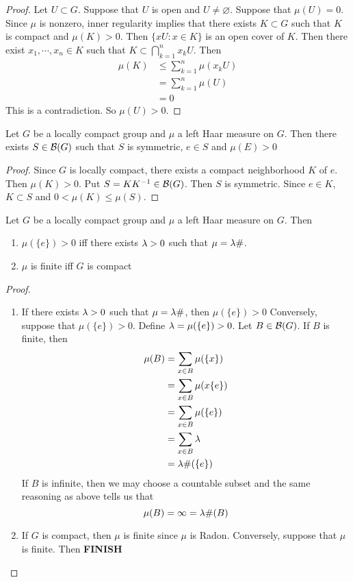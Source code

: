 \documentclass{book}
\begin{document}
	\begin{proof}
		Let $U \subset G$. Suppose that $U$ is open and $U \neq \varnothing$. Suppose that  $\mu(U) = 0$. Since $\mu$ is nonzero, inner regularity implies that there exists $K \subset G$ such that $K$ is compact and $\mu(K) > 0$. Then $ \{xU: x \in K\}$ is an open cover of $K$. Then there exist $x_1, \cdots, x_n \in K$ such that $K \subset \bigcap\limits_{k=1}^n x_kU$. Then 
		\begin{align}
			\mu(K) 
			& \leq \sum_{k =1}^n \mu(x_kU) \\
			& = \sum_{k =1}^n \mu(U) \\
			& = 0
		\end{align} 
		This is a contradiction. So $\mu(U) > 0$.
	\end{proof}

	\begin{ex}  
		Let $G$ be a locally compact group and $\mu$ a left Haar measure on $G$. Then there exists $S \in \mathcal{B}(G)$ such that $S$ is symmetric, $e \in S$ and $\mu(E) > 0$ 
	\end{ex}

	\begin{proof}
		Since $G$ is locally compact, there exists a compact neighborhood $K$ of $e$. Then $\mu(K) > 0$. Put $S = KK^{-1} \in \mathcal{B}(G)$. Then $S$ is symmetric. Since $e \in K$, $K \subset S$ and $0 < \mu(K) \leq \mu(S)$.
	\end{proof}
	
	\begin{ex}  
		Let $G$ be a locally compact group and $\mu$ a left Haar measure on $G$. Then 
		\begin{enumerate}
			\item  $\mu(\{e\}) > 0$ iff there exists $\lambda >0$ such that $\mu = \lambda \#$.
			\item $\mu$ is finite iff $G$ is compact
		\end{enumerate}
	\end{ex}

	\begin{proof}\
		\begin{enumerate}
			\item If there exists $\lambda >0$ such that $\mu = \lambda \#$, then $\mu(\{e\}) > 0$ Conversely, suppose that $\mu(\{e\}) > 0$. Define $\lambda = \mu(\{e\}) > 0$. Let $B \in \mathcal{B}(G)$. If $B$ is finite, then 
			\begin{align*}
				\mu(B) 
				& = \sum\limits_{x \in B}  \mu(\{x\}) \\
				& = \sum\limits_{x \in B} \mu(x \{e\}) \\
				& = \sum\limits_{x \in B} \mu( \{e\}) \\
				& = \sum\limits_{x \in B} \lambda \\
				& = \lambda \#(\{e\})
			\end{align*}
			If $B$ is infinite, then we may choose a countable subset and the same reasoning as above tells us that $$\mu(B) = \infty = \lambda \#(B)$$
			\item If $G$ is compact, then $\mu$ is finite since $\mu$ is Radon. Conversely, suppose that $\mu$ is finite. Then \textbf{FINISH}
		\end{enumerate}
	\end{proof}
	
\end{document}
